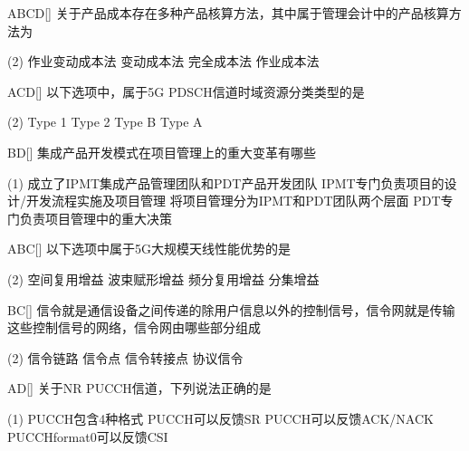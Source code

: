 \begin{choice}{\;ABCD\;}[]
    关于产品成本存在多种产品核算方法，其中属于管理会计中的产品核算方法为
    \begin{tasks}(2)
        \task 作业变动成本法
        \task 变动成本法
        \task 完全成本法
        \task 作业成本法
    \end{tasks}
\end{choice}

\begin{choice}{\;ACD\;}[]
    以下选项中，属于5G PDSCH信道时域资源分类类型的是
    \begin{tasks}(2)
        \task Type 1
        \task Type 2
        \task Type B
        \task Type A
    \end{tasks}
\end{choice}

\begin{choice}{\;BD\;}[]
    集成产品开发模式在项目管理上的重大变革有哪些
    \begin{tasks}(1)
        \task 成立了IPMT集成产品管理团队和PDT产品开发团队
        \task IPMT专门负责项目的设计/开发流程实施及项目管理
        \task 将项目管理分为IPMT和PDT团队两个层面
        \task PDT专门负责项目管理中的重大决策
    \end{tasks}
\end{choice}


\begin{choice}{\;ABC\;}[]
    以下选项中属于5G大规模天线性能优势的是
    \begin{tasks}(2)
        \task 空间复用增益
        \task 波束赋形增益
        \task 频分复用增益
        \task 分集增益
    \end{tasks}
\end{choice}


\begin{choice}{\;BC\;}[]
    信令就是通信设备之间传递的除用户信息以外的控制信号，信令网就是传输这些控制信号的网络，信令网由哪些部分组成
    \begin{tasks}(2)
        \task 信令链路
        \task 信令点
        \task 信令转接点
        \task 协议信令
    \end{tasks}
\end{choice}


\begin{choice}{\;AD\;}[]
    关于NR PUCCH信道，下列说法正确的是
    \begin{tasks}(1)
        \task PUCCH包含4种格式
        \task PUCCH可以反馈SR
        \task PUCCH可以反馈ACK/NACK
        \task PUCCHformat0可以反馈CSI
    \end{tasks}
\end{choice}


